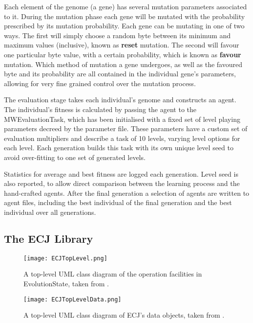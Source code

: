 Each element of the genome (a gene) has several mutation parameters associated to it. During the mutation phase each gene will be mutated with the probability prescribed by its mutation probability. Each gene can be mutating in one of two ways. The first will simply choose a random byte between its minimum and maximum values (inclusive), known as \textbf{reset} mutation. The second will favour one particular byte value, with a certain probability, which is known as \textbf{favour} mutation. Which method of mutation a gene undergoes, as well as the favoured byte and its probability are all contained in the individual gene's parameters, allowing for very fine grained control over the mutation process.

The evaluation stage takes each individual's genome and constructs an agent. The individual's fitness is calculated by passing the agent to the MWEvaluationTask, which has been initialised with a fixed set of level playing parameters decreed by the parameter file. These parameters have a custom set of evaluation multipliers and describe a task of 10 levels, varying level options for each level. Each generation builds this task with its own unique level seed to avoid over-fitting to one set of generated levels.

Statistics for average and best fitness are logged each generation. Level seed is also reported, to allow direct comparison between the learning process and the hand-crafted agents. After the final generation a selection of agents are written to agent files, including the best individual of the final generation and the best individual over all generations.


\subsection{The ECJ Library}

\begin{figure}[t]
	\centering
	\texttt{[image: ECJTopLevel.png]}
	\caption{A top-level UML class diagram of the operation facilities in EvolutionState, taken from \cite[p.~10]{ecj-manual}.}
	\label{fig:ecjop}
\end{figure}

\begin{figure}[t]
	\centering
	\texttt{[image: ECJTopLevelData.png]}
	\caption{A top-level UML class diagram of ECJ's data objects, taken from \cite[p.~11]{ecj-manual}.}
	\label{fig:ecjdata}
\end{figure}

